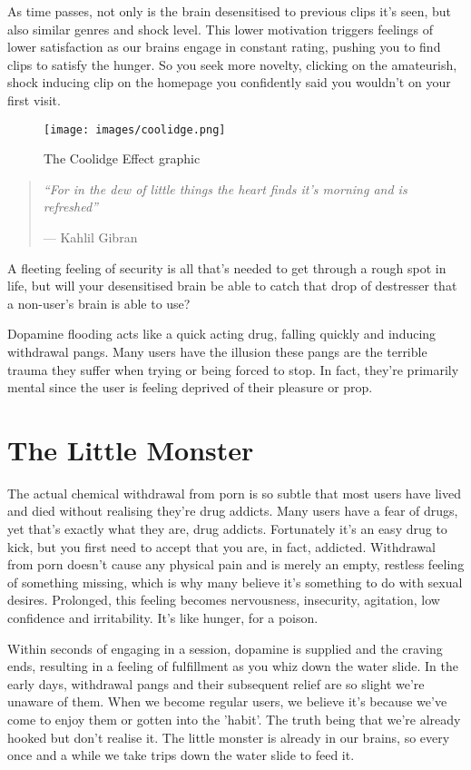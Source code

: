 \documentclass[
]{book}
\begin{document}
As time passes, not only is the brain desensitised to previous clips it's seen, but also similar genres and shock level. This lower motivation triggers feelings of lower satisfaction as our brains engage in constant rating, pushing you to find clips to satisfy the hunger. So you seek more novelty, clicking on the amateurish, shock inducing clip on the homepage you confidently said you wouldn't on your first visit.

\begin{figure}
\centering
\texttt{[image: images/coolidge.png]}
\caption{The Coolidge Effect graphic}
\end{figure}

\begin{quote}
\emph{``For in the dew of little things the heart finds it's morning and is refreshed''}

--- Kahlil Gibran
\end{quote}

A fleeting feeling of security is all that's needed to get through a rough spot in life, but will your desensitised brain be able to catch that drop of destresser that a non-user's brain is able to use?

Dopamine flooding acts like a quick acting drug, falling quickly and inducing withdrawal pangs. Many users have the illusion these pangs are the terrible trauma they suffer when trying or being forced to stop. In fact, they're primarily mental since the user is feeling deprived of their pleasure or prop.

\hypertarget{the-little-monster}{%
\section{The Little Monster}\label{the-little-monster}}

The actual chemical withdrawal from porn is so subtle that most users have lived and died without realising they're drug addicts. Many users have a fear of drugs, yet that's exactly what they are, drug addicts. Fortunately it's an easy drug to kick, but you first need to accept that you are, in fact, addicted. Withdrawal from porn doesn't cause any physical pain and is merely an empty, restless feeling of something missing, which is why many believe it's something to do with sexual desires. Prolonged, this feeling becomes nervousness, insecurity, agitation, low confidence and irritability. It's like hunger, for a poison.

Within seconds of engaging in a session, dopamine is supplied and the craving ends, resulting in a feeling of fulfillment as you whiz down the water slide. In the early days, withdrawal pangs and their subsequent relief are so slight we're unaware of them. When we become regular users, we believe it's because we've come to enjoy them or gotten into the 'habit'. The truth being that we're already hooked but don't realise it. The little monster is already in our brains, so every once and a while we take trips down the water slide to feed it.
\end{document}
